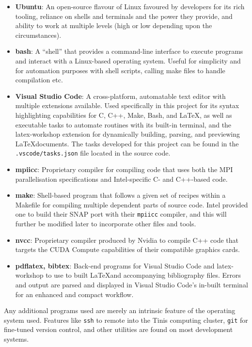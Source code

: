 \documentclass[conference]{IEEEtran}
\begin{document}
\begin{itemize}
    \item \textbf{Ubuntu}: An open-source flavour of Linux favoured by developers for its rich tooling, reliance on shells and terminals and the power they provide, and ability to work at multiple levels (high or low depending upon the circumstances).
    \item \textbf{bash}: A ``shell'' that provides a command-line interface to execute programs and interact with a Linux-based operating system. Useful for simplicity and for automation purposes with shell scripts, calling make files to handle compilation etc.
    \item \textbf{Visual Studio Code}: A cross-platform, automatable text editor with multiple extensions available. Used specifically in this project for its syntax highlighting capabilities for C, C++, Make, Bash, and \LaTeX, as well as executable tasks to automate routines with its built-in terminal, and the latex-workshop extension for dynamically building, parsing, and previewing \LaTeX documents. The tasks developed for this project can be found in the \texttt{.vscode/tasks.json} file located in the source code.
    \item \textbf{mpiicc}: Proprietary compiler for compiling code that uses both the MPI parallelisation specifications and Intel-specific C- and C++-based code.
    \item \textbf{make}: Shell-based program that follows a given set of recipes within a Makefile for compiling multiple dependent parts of source code. Intel provided one to build their SNAP port with their \texttt{mpiicc} compiler, and this will further be modified later to incorporate other files and tools.
    \item \textbf{nvcc}: Proprietary compiler produced by Nvidia to compile C++ code that targets the CUDA Compute capabilities of their compatible graphics cards.
    \item \textbf{pdflatex, bibtex}: Back-end programs for Visual Studio Code and latex-workshop to use to built \LaTeX and accompanying bibliography files. Errors and output are parsed and displayed in Visual Studio Code's in-built terminal for an enhanced and compact workflow.
\end{itemize}

Any additional programs used are merely an intrinsic feature of the operating system used. Features like \texttt{ssh} to remote into the Tinis computing cluster, \texttt{git} for fine-tuned version control, and other utilities are found on most development systems.
\end{document}
